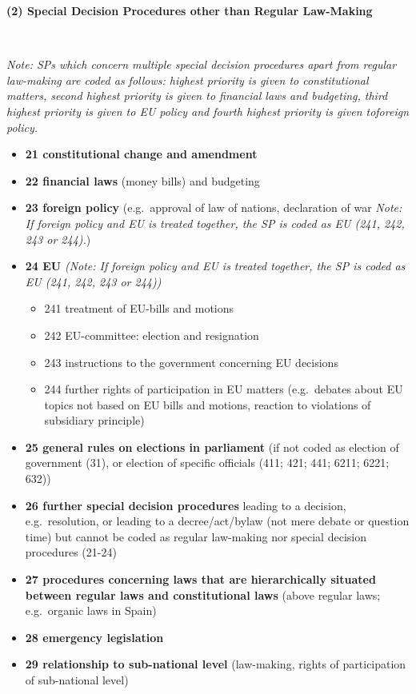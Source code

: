 \documentclass[]{article}
\providecommand{\tightlist}{%
  \setlength{\itemsep}{0pt}\setlength{\parskip}{0pt}}
\begin{document}
\textbf{(2) Special Decision Procedures other than Regular Law-Making}

~

\emph{Note: SPs which concern multiple special decision procedures apart
from regular law-making are coded as follows: highest priority is given
to constitutional matters, second highest priority is given to financial
laws and budgeting, third highest priority is given to EU policy and
fourth highest priority is given toforeign policy.}

\begin{itemize}
\tightlist
\item
  \textbf{21 constitutional change and amendment}
\item
  \textbf{22 financial laws} (money bills) and budgeting
\item
  \textbf{23 foreign policy} (e.g.~approval of law of nations,
  declaration of war \emph{Note: If foreign policy and EU is treated
  together, the SP is coded as EU (241, 242, 243 or 244).})
\item
  \textbf{24 EU} \emph{(Note: If foreign policy and EU is treated
  together, the SP is coded as EU (241, 242, 243 or 244))}

  \begin{itemize}
  \tightlist
  \item
    241 treatment of EU-bills and motions
  \item
    242 EU-committee: election and resignation
  \item
    243 instructions to the government concerning EU decisions
  \item
    244 further rights of participation in EU matters (e.g.~debates
    about EU topics not based on EU bills and motions, reaction to
    violations of subsidiary principle)
  \end{itemize}
\item
  \textbf{25 general rules on elections in parliament} (if not coded as
  election of government (31), or election of specific officials (411;
  421; 441; 6211; 6221; 632))
\item
  \textbf{26 further special decision procedures} leading to a decision,
  e.g.~resolution, or leading to a decree/act/bylaw (not mere debate or
  question time) but cannot be coded as regular law-making nor special
  decision procedures (21-24)
\item
  \textbf{27 procedures concerning laws that are hierarchically situated
  between regular laws and constitutional laws} (above regular laws;
  e.g.~organic laws in Spain)
\item
  \textbf{28 emergency legislation}
\item
  \textbf{29 relationship to sub-national level} (law-making, rights of
  participation of sub-national level)
\end{itemize}
\end{document}
